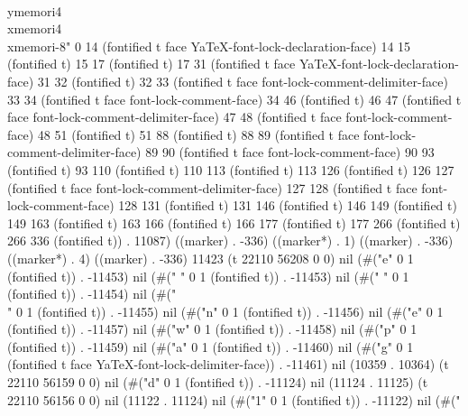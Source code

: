 {   \\ymemori{4}
   \\xmemori{4}
   \\xmemori{-8}" 0 14 (fontified t face YaTeX-font-lock-declaration-face) 14 15 (fontified t) 15 17 (fontified t) 17 31 (fontified t face YaTeX-font-lock-declaration-face) 31 32 (fontified t) 32 33 (fontified t face font-lock-comment-delimiter-face) 33 34 (fontified t face font-lock-comment-face) 34 46 (fontified t) 46 47 (fontified t face font-lock-comment-delimiter-face) 47 48 (fontified t face font-lock-comment-face) 48 51 (fontified t) 51 88 (fontified t) 88 89 (fontified t face font-lock-comment-delimiter-face) 89 90 (fontified t face font-lock-comment-face) 90 93 (fontified t) 93 110 (fontified t) 110 113 (fontified t) 113 126 (fontified t) 126 127 (fontified t face font-lock-comment-delimiter-face) 127 128 (fontified t face font-lock-comment-face) 128 131 (fontified t) 131 146 (fontified t) 146 149 (fontified t) 149 163 (fontified t) 163 166 (fontified t) 166 177 (fontified t) 177 266 (fontified t) 266 336 (fontified t)) . 11087) ((marker) . -336) ((marker*) . 1) ((marker) . -336) ((marker*) . 4) ((marker) . -336) 11423 (t 22110 56208 0 0) nil (#("e" 0 1 (fontified t)) . -11453) nil (#("
" 0 1 (fontified t)) . -11453) nil (#(" " 0 1 (fontified t)) . -11454) nil (#("\\" 0 1 (fontified t)) . -11455) nil (#("n" 0 1 (fontified t)) . -11456) nil (#("e" 0 1 (fontified t)) . -11457) nil (#("w" 0 1 (fontified t)) . -11458) nil (#("p" 0 1 (fontified t)) . -11459) nil (#("a" 0 1 (fontified t)) . -11460) nil (#("g" 0 1 (fontified t face YaTeX-font-lock-delimiter-face)) . -11461) nil (10359 . 10364) (t 22110 56159 0 0) nil (#("d" 0 1 (fontified t)) . -11124) nil (11124 . 11125) (t 22110 56156 0 0) nil (11122 . 11124) nil (#("1" 0 1 (fontified t)) . -11122) nil (#("
}
